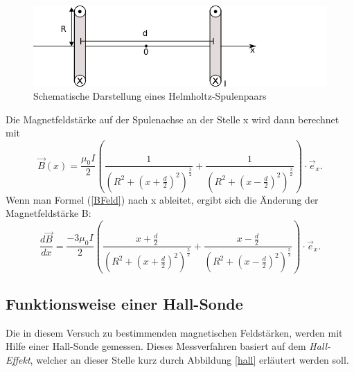 \documentclass[11pt,ngerman,a4paper]{article}
\begin{document}
\begin{figure}[htp]
\centering
\includegraphics[scale=1.00]{helmholtz.png}
\caption{Schematische Darstellung eines Helmholtz-Spulenpaars}
\label{hhspule}
\end{figure}
\noindent
Die Magnetfeldstärke auf der Spulenachse an der Stelle x wird dann berechnet mit 
\begin{equation}
\vec B(x)= \frac{\mu_0I}{2}\left(\frac1{\left(R^2 + (x+\frac d2)^2 \right)^\frac32} + \frac1{\left(R^2 + (x-\frac d2)^2 \right)^\frac32}  \right) \cdot \vec e_x.
\label{BFeld}
\end{equation}
Wenn man Formel (\ref{BFeld}) nach x ableitet, ergibt sich die Änderung der Magnetfeldstärke B:
\begin{equation}
\frac{d\vec B}{d x} = \frac{-3\mu_0I}{2}\left( \frac{x+\frac d2}{\left(R^2 + (x+\frac d2)^2 \right)^\frac52} + \frac{x-\frac d2}{\left(R^2 + (x-\frac d2)^2 \right)^\frac52}\right) \cdot \vec e_x.
\end{equation}
\subsection{Funktionsweise einer Hall-Sonde}
Die in diesem Versuch zu bestimmenden magnetischen Feldstärken, werden mit Hilfe einer Hall-Sonde gemessen. Dieses Messverfahren basiert auf dem \textit{Hall-Effekt}, welcher an dieser Stelle kurz durch Abbildung \ref{hall} erläutert werden soll.  
\end{document}

